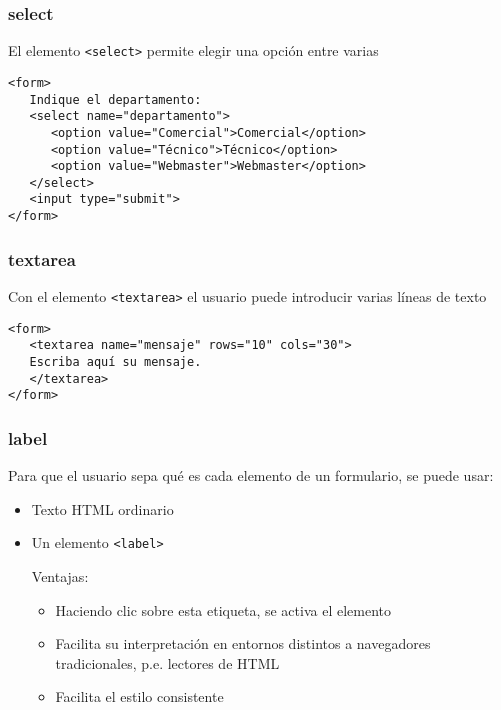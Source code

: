 \documentclass[ucs]{beamer}
\begin{document}
\begin{frame}[fragile]
\frametitle{select}
El elemento
\verb|<select>|
permite elegir una opción entre varias


  \begin{scriptsize}
  \begin{verbatim}
<form>
   Indique el departamento:
   <select name="departamento">
      <option value="Comercial">Comercial</option>
      <option value="Técnico">Técnico</option>
      <option value="Webmaster">Webmaster</option>
   </select>
   <input type="submit">
</form>
  \end{verbatim}
  \end{scriptsize}

\end{frame}



\begin{frame}[fragile]
\frametitle{textarea}

Con el elemento
\verb|<textarea>|
el usuario puede introducir varias líneas de texto


  \begin{scriptsize}
  \begin{verbatim}
<form>
   <textarea name="mensaje" rows="10" cols="30">
   Escriba aquí su mensaje.
   </textarea>
</form>
  \end{verbatim}
  \end{scriptsize}



\end{frame}



\begin{frame}[fragile]
\frametitle{label}

Para que el usuario sepa qué es cada
elemento de un formulario, se puede usar:
    \begin{itemize}
    \item
Texto HTML ordinario
    \item
Un elemento
\verb|<label>|

Ventajas:

    \begin{itemize}
    \item
Haciendo clic sobre esta etiqueta, se activa el elemento
    \item
Facilita su interpretación en entornos distintos a navegadores tradicionales, p.e. lectores de HTML
    \item
Facilita el estilo consistente
    \end{itemize}
    \end{itemize}



\end{frame}
\end{document}
